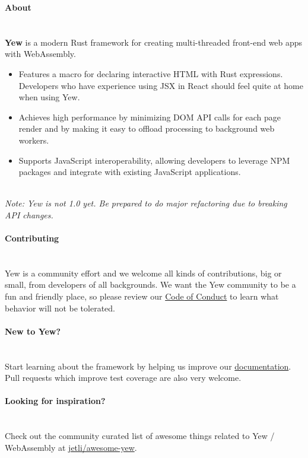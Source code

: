 \documentclass{article}
\begin{document}
{\noindent \LARGE \textbf{About}}\\\\
\\
\textbf{Yew} is a modern Rust framework for creating multi-threaded front-end web apps with WebAssembly.\\
\begin{itemize}
	\item Features a macro for declaring interactive HTML with Rust expressions. Developers who have experience using JSX in React should feel quite at home when using Yew.
	\item Achieves high performance by minimizing DOM API calls for each page render and by making it easy to offload processing to background web workers.
	\item Supports JavaScript interoperability, allowing developers to leverage NPM packages and integrate with existing JavaScript applications.
\end{itemize}
\\
\textit{Note: Yew is not 1.0 yet. Be prepared to do major refactoring due to breaking API changes.}\\
\\
{\noindent \LARGE \textbf{Contributing}}\\\\
\\
Yew is a community effort and we welcome all kinds of contributions, big or small, from developers of all backgrounds. We want the Yew community to be a fun and friendly place, so please review our \href{CODE_OF_CONDUCT.md}{Code of Conduct} to learn what behavior will not be tolerated.\\
\\
{\noindent \Large \textbf{New to Yew?}}\\\\
\\
Start learning about the framework by helping us improve our \href{https://github.com/yewstack/yew/tree/master/website/docs}{documentation}. Pull requests which improve test coverage are also very welcome.\\
\\
{\noindent \Large \textbf{Looking for inspiration?}}\\\\
\\
Check out the community curated list of awesome things related to Yew / WebAssembly at \href{https://github.com/jetli/awesome-yew}{jetli/awesome-yew}.\\
\end{document}
